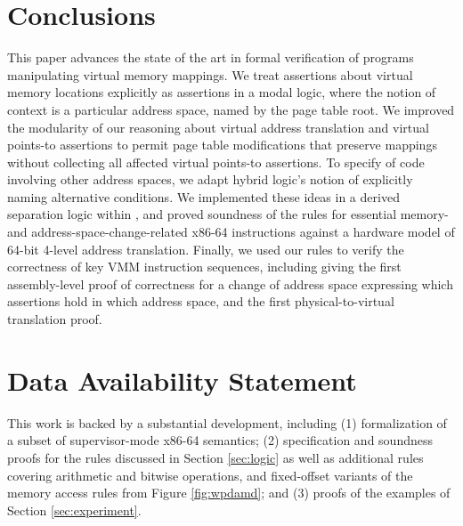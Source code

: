 \documentclass[acmsmall,screen,nonacm,review,anonymous]{acmart}
\begin{document}
\section{Conclusions}
This paper advances the state of the art in formal verification of programs manipulating virtual memory mappings.
We treat assertions about virtual
memory locations explicitly as assertions in a modal logic, where the notion of context
is a particular address space, named by the page table root.
We improved the modularity of our reasoning about virtual address translation and virtual points-to assertions
to permit page table modifications that
preserve mappings without collecting all affected virtual points-to assertions.
To specify of code involving other address spaces, we adapt 
hybrid logic's notion of explicitly naming alternative conditions.
We implemented these ideas in a derived separation logic within \iris, and proved soundness of
the rules for essential memory- and address-space-change-related x86-64 instructions 
against a hardware model of 64-bit 4-level address translation.
Finally, we used our rules to verify the correctness of key VMM instruction sequences,
including giving the first assembly-level proof of correctness for a change
of address space expressing which assertions hold in which address space, 
and the first physical-to-virtual translation proof.

\section*{Data Availability Statement}
This work is backed by a substantial \rocq development, including
(1) formalization of a subset of supervisor-mode x86-64 semantics;
(2) specification and soundness proofs for the rules discussed in Section \ref{sec:logic}
as well as additional rules covering arithmetic and bitwise operations,
and fixed-offset variants of the memory access rules from Figure \ref{fig:wpdamd};
and (3) proofs of the examples of Section \ref{sec:experiment}.
\end{document}
